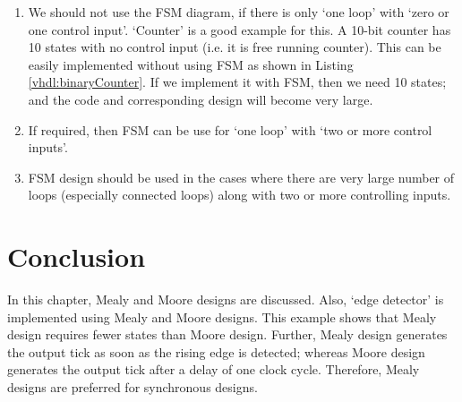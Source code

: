 \begin{enumerate}
	\item We should not use the FSM diagram, if there is only `one loop' with `zero or one control input'. `Counter' is a good example for this. A 10-bit counter has 10 states with no control input (i.e. it is free running counter). This can be easily implemented without using FSM as shown in Listing \ref{vhdl:binaryCounter}. If we implement it with FSM, then we need 10 states; and the code and corresponding design will become very large. 
	
	\item If required, then FSM can be use for `one loop' with `two or more control inputs'. 
	
	\item FSM design should be used in the cases where there are very large number of loops (especially connected loops) along with two or more controlling inputs. 
	
\end{enumerate}
\section{Conclusion}
In this chapter, Mealy and Moore designs are discussed. Also, `edge detector' is implemented using Mealy and Moore designs. This example shows that Mealy design requires fewer states than Moore design. Further, Mealy design generates the output tick as soon as the rising edge is detected; whereas Moore design generates the output tick after a delay of one clock cycle. Therefore, Mealy designs are preferred for synchronous designs. 